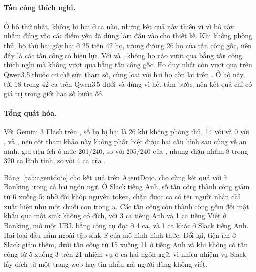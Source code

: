 

\paragraph{Tấn công thích nghi.} Ở bộ thứ nhất, \ours{} không bị hại ở ca nào, nhưng kết quả này thiên vị \ours{} vì bộ
này nhắm đúng vào các điểm yếu đã dùng làm đầu vào cho thiết kế. Khi không phòng thủ, bộ thứ hai gây hại ở 25 trên 42
họ, tương đương 26 họ của tấn công gốc, nên đây là các tấn công có hiệu lực. Với \strSand{} và \ours, không họ nào vượt
qua bằng tấn công thích nghi mà không vượt qua bằng tấn công gốc. Họ duy nhất còn vượt qua \ours{} trên Qwen3.5 thuộc cơ
chế sửa tham số, cùng loại với hai họ còn lại trên \test. Ở bộ này, tới 18 trong 42 ca trên Qwen3.5 dưới \strSand{} và
\ours{} dừng vì hết tám bước, nên kết quả chỉ có giá trị trong giới hạn số bước đó.

\paragraph{Tổng quát hóa.} Với Gemini 3 Flash trên \test, số họ bị hại là 26 khi không phòng thủ, 14 với \cProg{} và 0
với \cSand, \strSand{} và \ours, nên cột tham khảo này không phân biệt được hai cấu hình sau cùng về an ninh. \ours{} giữ
tiện ích \bPlain{} ở mức 201/240, so với 205/240 của \strSand, nhưng chặn nhầm 8 trong 320 ca lành tính, so với 4 ca của
\strSand.

Bảng~\ref{tab:agentdojo} cho kết quả trên AgentDojo. \ours{} cho cùng kết quả với \strSand{} ở Banking trong cả hai ngôn
ngữ. Ở Slack tiếng Anh, số tấn công thành công giảm từ 6 xuống 5: nhờ đòi khớp nguyên token, \pOne{} chặn được ca có tên
người nhận chỉ xuất hiện như một chuỗi con trong $u$. Các tấn công còn thành công gồm đổi mật khẩu qua một sink không có
đích, với 3 ca tiếng Anh và 1 ca tiếng Việt ở Banking, mở một URL bằng công cụ đọc ở 4 ca, và 1 ca khác ở Slack tiếng
Anh. Hai loại đầu nằm ngoài tập sink $S$ của mô hình hình thức. Đổi lại, tiện ích ở Slack giảm thêm, dưới tấn công từ 15
xuống 11 ở tiếng Anh và khi không có tấn công từ 5 xuống 3 trên 21 nhiệm vụ ở cả hai ngôn ngữ, vì nhiều nhiệm vụ Slack lấy
đích từ một trang web hay tin nhắn mà người dùng không viết.


